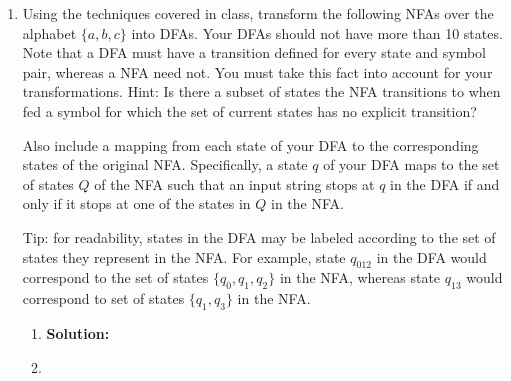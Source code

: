 \documentclass[11pt]{article}
\begin{document}
\begin{enumerate}
\begin{enumerate}
    
\end{enumerate}

\newpage

\item Using the techniques covered in class, transform the following NFAs over the alphabet $\{a, b, c\}$ into DFAs. Your DFAs should not have more than 10 states.  Note that a DFA must have a transition defined for every state and symbol pair, whereas a NFA need not. You must take this fact into account for your transformations. Hint: Is there a subset of states the NFA transitions to when fed a symbol for which the set of current states has no explicit transition?

Also include a mapping from each state of your DFA to the corresponding states of the original NFA.  Specifically, a state $q$ of your DFA maps to the set of states $Q$ of the NFA such that an input string stops at $q$ in the DFA if and only if it stops at one of the states in $Q$ in the NFA.

Tip: for readability, states in the DFA may be labeled according to the set of states they represent in the NFA.  For example, state $q_{012}$ in the DFA would correspond to the set of states $\{q_0, q_1, q_2\}$ in the NFA, whereas state $q_{13}$ would correspond to set of states $\{q_1, q_3\}$ in the NFA.

\begin{enumerate}
    \item {}

    \textbf{Solution:}
    
    \item {}


\end{enumerate}
\end{enumerate}
\end{document}
